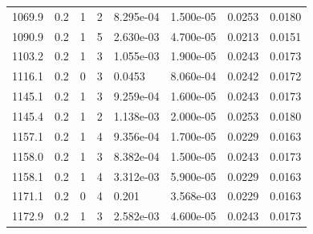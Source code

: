 \documentclass[preview]{standalone}
\begin{document}
{{{\begin{tabular}{L{1.2cm}C{1.2cm} C{0.3cm}C{0.5cm} C{1.4cm}C{1.4cm} C{1.4cm}C{1.4cm}}
  1069.9  &   0.2  & 1     &  2 &  8.295e-04  & 1.500e-05  & 0.0253 &  0.0180   \\ 
  1090.9  &   0.2  & 1     &  5 &  2.630e-03  & 4.700e-05  & 0.0213 &  0.0151   \\ 
  1103.2  &   0.2  & 1     &  3 &  1.055e-03  & 1.900e-05  & 0.0243 &  0.0173   \\ 
  1116.1  &   0.2  & 0     &  3 &  0.0453  & 8.060e-04  & 0.0242 &  0.0172   \\ 
  1145.1  &   0.2  & 1     &  3 &  9.259e-04  & 1.600e-05  & 0.0243 &  0.0173   \\ 
  1145.4  &   0.2  & 1     &  2 &  1.138e-03  & 2.000e-05  & 0.0253 &  0.0180   \\ 
  1157.1  &   0.2  & 1     &  4 &  9.356e-04  & 1.700e-05  & 0.0229 &  0.0163   \\ 
  1158.0  &   0.2  & 1     &  3 &  8.382e-04  & 1.500e-05  & 0.0243 &  0.0173   \\ 
  1158.1  &   0.2  & 1     &  4 &  3.312e-03  & 5.900e-05  & 0.0229 &  0.0163   \\ 
  1171.1  &   0.2  & 0     &  4 &  0.201  & 3.568e-03  & 0.0229 &  0.0163   \\ 
  1172.9  &   0.2  & 1     &  3 &  2.582e-03  & 4.600e-05  & 0.0243 &  0.0173   \\ 
\hline 
\end{tabular} 

}}}
\end{document}
